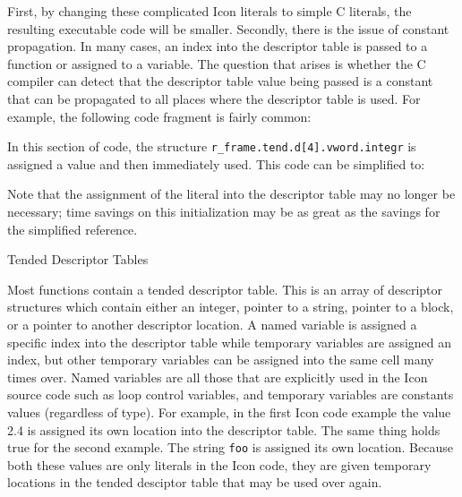 First, by changing these complicated Icon literals to simple C
literals, the resulting executable code will be smaller. Secondly,
there is the issue of constant propagation. In many cases, an index
into the descriptor table is passed to a function or assigned to a
variable. The question that arises is whether the C compiler can
detect that the descriptor table value being passed is a constant that
can be propagated to all places where the descriptor table is used.
For example, the following code fragment is fairly common:


In this section of code, the structure
\texttt{r\_frame.tend.d[4].vword.integr} is assigned a value and then
immediately used. This code can be simplified to:



Note that the assignment of the literal into the descriptor table may
no longer be necessary; time savings on this initialization may be as
great as the savings for the simplified reference.

{\sffamily
Tended Descriptor Tables}


Most functions contain a tended descriptor table. This is an array of
descriptor structures which contain either an integer, pointer to a
string, pointer to a block, or a pointer to another descriptor
location. A named variable is assigned a specific index into the
descriptor table while temporary variables are assigned an index, but
other temporary variables can be assigned into the same cell many
times over. Named variables are all those that are explicitly used in
the Icon source code such as loop control variables, and temporary
variables are constants values (regardless of type). For example, in
the first Icon code example the value 2.4 is assigned its own location
into the descriptor table. The same thing holds true for the second
example. The string \texttt{{\textquotedbl}foo{\textquotedbl}} is
assigned its own location. Because both these values are only literals
in the Icon code, they are given temporary locations in the tended
desciptor table that may be used over again.




